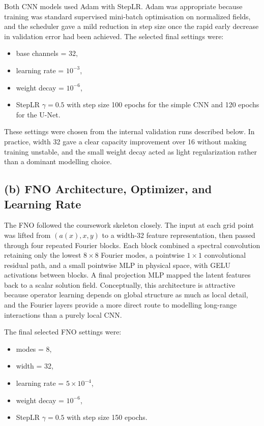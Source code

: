 \documentclass[11pt]{article}
\begin{document}
Both CNN models used Adam with StepLR. Adam was appropriate because training was standard supervised mini-batch optimisation on normalized fields, and the scheduler gave a mild reduction in step size once the rapid early decrease in validation error had been achieved. The selected final settings were:
\begin{itemize}[itemsep=0.25em]
    \item base channels = 32,
    \item learning rate = \(10^{-3}\),
    \item weight decay = \(10^{-6}\),
    \item StepLR \(\gamma = 0.5\) with step size 100 epochs for the simple CNN and 120 epochs for the U-Net.
\end{itemize}

These settings were chosen from the internal validation runs described below. In practice, width 32 gave a clear capacity improvement over 16 without making training unstable, and the small weight decay acted as light regularization rather than a dominant modelling choice.

\subsection*{(b) FNO Architecture, Optimizer, and Learning Rate}

The FNO followed the coursework skeleton closely. The input at each grid point was lifted from \((a(x),x,y)\) to a width-32 feature representation, then passed through four repeated Fourier blocks. Each block combined a spectral convolution retaining only the lowest \(8\times8\) Fourier modes, a pointwise \(1\times1\) convolutional residual path, and a small pointwise MLP in physical space, with GELU activations between blocks. A final projection MLP mapped the latent features back to a scalar solution field. Conceptually, this architecture is attractive because operator learning depends on global structure as much as local detail, and the Fourier layers provide a more direct route to modelling long-range interactions than a purely local CNN.

The final selected FNO settings were:
\begin{itemize}[itemsep=0.25em]
    \item modes = 8,
    \item width = 32,
    \item learning rate = \(5\times10^{-4}\),
    \item weight decay = \(10^{-6}\),
    \item StepLR \(\gamma = 0.5\) with step size 150 epochs.
\end{itemize}
\end{document}
